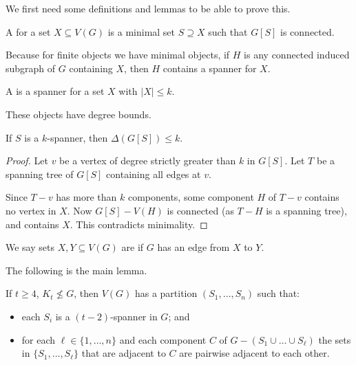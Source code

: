 \documentclass[main.tex]{subfiles}
\begin{document}
We first need some definitions and lemmas to be able to prove this.
\begin{definition*}[Spanner]
  A  for a set $X\subseteq V(G)$ is a minimal set $S\supseteq X$
  such that $G[S]$ is connected.
\end{definition*}
Because for finite objects we have minimal objects, if $H$ is any connected
induced subgraph of $G$ containing $X$, then $H$ contains a spanner for $X$.
\begin{definition*}[$k$-spanner]
  A  is a spanner for a set $X$ with
  $|X|\leq k$.
\end{definition*}
These objects have degree bounds.
\begin{proposition}
  If $S$ is a $k$-spanner, then $\Delta(G[S])\leq k$.
\end{proposition}
\begin{proof}
  Let $v$ be a vertex of degree strictly greater than $k$ in $G[S]$.
  Let $T$ be a spanning tree of $G[S]$ containing all edges at $v$.

  Since $T - v$ has more than $k$ components, some component $H$ of $T - v$
  contains no vertex in $X$.
  Now $G[S] - V(H)$ is connected (as $T - H$ is a spanning tree), and contains
  $X$.
  This contradicts minimality.
\end{proof}
\begin{definition*}
  We say sets $X,Y\subseteq V(G)$ are  if $G$ has an edge from
  $X$ to $Y$.
\end{definition*}
The following is the main lemma.
\begin{lemma}
  If $t\geq 4$, $K_t\not\leq G$, then $V(G)$ has a partition $(S_1,\ldots,S_n)$
  such that:
  \begin{itemize}
    \item each $S_i$ is a $(t-2)$-spanner in $G$; and
    \item for each $\ell\in\{1,\ldots,n\}$ and each component $C$ of
      $G - (S_1\cup\ldots\cup S_\ell)$ the sets in $\{S_1,\ldots, S_\ell\}$
      that are adjacent to $C$ are pairwise adjacent to each other.
  \end{itemize}
\end{lemma}
\end{document}
